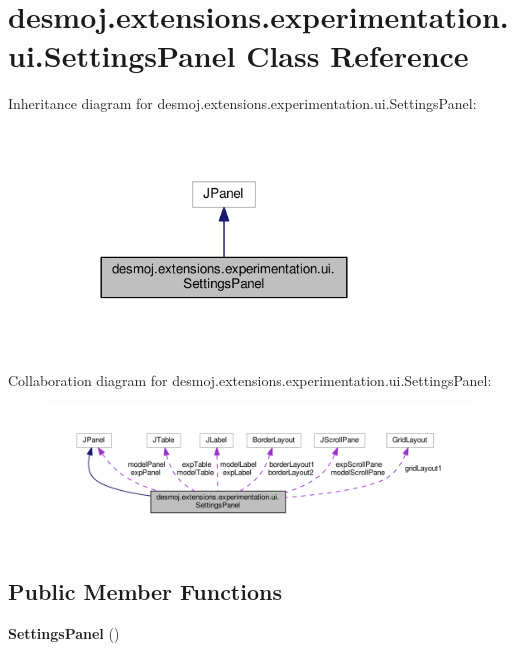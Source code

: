 \section{desmoj.\-extensions.\-experimentation.\-ui.\-Settings\-Panel Class Reference}
\label{classdesmoj_1_1extensions_1_1experimentation_1_1ui_1_1_settings_panel}


Inheritance diagram for desmoj.\-extensions.\-experimentation.\-ui.\-Settings\-Panel\-:
\nopagebreak
\begin{figure}[H]
\begin{center}
\leavevmode
\includegraphics[width=264pt]{classdesmoj_1_1extensions_1_1experimentation_1_1ui_1_1_settings_panel__inherit__graph}
\end{center}
\end{figure}


Collaboration diagram for desmoj.\-extensions.\-experimentation.\-ui.\-Settings\-Panel\-:
\nopagebreak
\begin{figure}[H]
\begin{center}
\leavevmode
\includegraphics[width=350pt]{classdesmoj_1_1extensions_1_1experimentation_1_1ui_1_1_settings_panel__coll__graph}
\end{center}
\end{figure}
\subsection*{Public Member Functions}
\begin{DoxyCompactItemize}
\item 
{\bf Settings\-Panel} ()
\end{DoxyCompactItemize}


